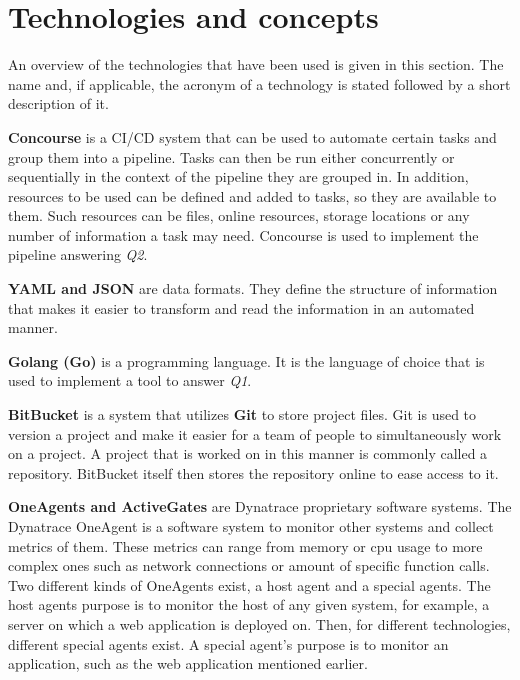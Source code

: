 \chapter{Technologies and concepts}\label{ch:technologies-used}

An overview of the technologies that have been used is given in this section.
The name and, if applicable, the acronym of a technology is stated followed by a short description of it.

\textbf{Concourse}\cite{concourse} is a CI/CD system that can be used to automate certain tasks and group them into a pipeline.
Tasks can then be run either concurrently or sequentially in the context of the pipeline they are grouped in.
In addition, resources to be used can be defined and added to tasks, so they are available to them.
Such resources can be files, online resources, storage locations or any number of information a task may need.
Concourse is used to implement the pipeline answering \textit{Q2}.

\textbf{YAML and JSON}\cite{yaml,json} are data formats.
They define the structure of information that makes it easier to transform and read the information in an automated manner.

\textbf{Golang (Go)}\cite{golang} is a programming language.
It is the language of choice that is used to implement a tool to answer \textit{Q1}.

\textbf{BitBucket}\cite{bitbucket} is a system that utilizes \textbf{Git}\cite{git} to store project files.
Git is used to version a project and make it easier for a team of people to simultaneously work on a project.
A project that is worked on in this manner is commonly called a repository.
BitBucket itself then stores the repository online to ease access to it.

\pagebreak

\textbf{OneAgents and ActiveGates}\cite{oneagents,activegates} are Dynatrace proprietary software systems.
The Dynatrace OneAgent\cite{oneagents} is a software system to monitor other systems and collect metrics of them.
These metrics can range from memory or cpu usage to more complex ones such as network connections or amount of specific function calls.
Two different kinds of OneAgents exist, a host agent and a special agents.
The host agents purpose is to monitor the host of any given system, for example, a server on which a web application is deployed on.
Then, for different technologies, different special agents exist.
A special agent's purpose is to monitor an application, such as the web application mentioned earlier.

